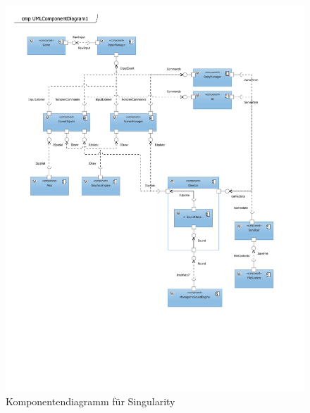 \documentclass[12pt]{article}
\begin{document}
\newpage
\begin{figure}[h!]
    \centering
    \includegraphics[trim={0 5cm 0 0}, clip, width=\linewidth]{res/component.pdf}
    \caption{Komponentendiagramm für Singularity}
\end{figure}
\end{document}
